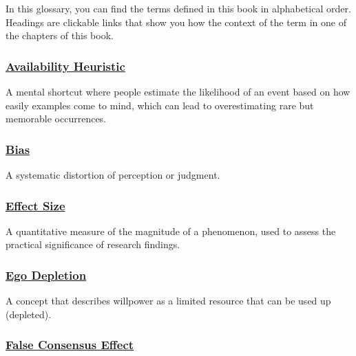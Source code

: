 \documentclass[
  letterpaper,
]{book}
\begin{document}
In this glossary, you can find the terms defined in this book in
alphabetical order. Headings are clickable links that show you how the
context of the term in one of the chapters of this book.

\subsubsection*{\texorpdfstring{\hyperref[def-availabilityheuristic]{Availability
Heuristic}}{Availability Heuristic}}\label{availability-heuristic}

A mental shortcut where people estimate the likelihood of an event based
on how easily examples come to mind, which can lead to overestimating
rare but memorable occurrences.

\subsubsection*{\texorpdfstring{\hyperref[def-bias]{Bias}}{Bias}}\label{bias}

A systematic distortion of perception or judgment.

\subsubsection*{\texorpdfstring{\hyperref[def-effectsize]{Effect
Size}}{Effect Size}}\label{effect-size}

A quantitative measure of the magnitude of a phenomenon, used to assess
the practical significance of research findings.

\subsubsection*{\texorpdfstring{\hyperref[def-egodepletion]{Ego
Depletion}}{Ego Depletion}}\label{ego-depletion-1}

A concept that describes willpower as a limited resource that can be
used up (depleted).

\subsubsection*{\texorpdfstring{\hyperref[def-falseconsensus]{False
Consensus
Effect}}{False Consensus Effect}}\label{false-consensus-effect-1}
\end{document}
